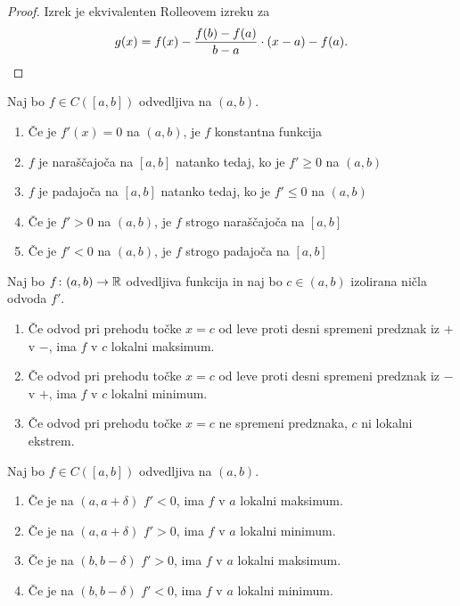 \documentclass[12pt, a4paper]{article}
\begin{document}
\begin{proof}
Izrek je ekvivalenten Rolleovem izreku za
\[
g(x)=f(x)-\frac{f(b)-f(a)}{b-a}\cdot (x-a)-f(a).\qedhere
\]
\end{proof}

\begin{posledica}\label{psl:lag}
Naj bo $f\in C\left([a,b]\right)$ odvedljiva na $(a,b)$.

\begin{enumerate}[label=\arabic*)]
\item Če je $f'(x)=0$ na $(a,b)$, je $f$ konstantna funkcija
\item $f$ je naraščajoča na $[a,b]$ natanko tedaj, ko je $f'\geq 0$ na $(a,b)$
\item $f$ je padajoča na $[a,b]$ natanko tedaj, ko je $f'\leq 0$ na $(a,b)$
\item Če je $f'>0$ na $(a,b)$, je $f$ strogo naraščajoča na $[a,b]$
\item Če je $f'<0$ na $(a,b)$, je $f$ strogo padajoča na $[a,b]$
\end{enumerate}
\end{posledica}

\begin{posledica}
Naj bo $f\colon(a,b)\to\mathbb{R}$ odvedljiva funkcija in naj bo $c\in(a,b)$ izolirana ničla odvoda $f'$.

\begin{enumerate}[label=\arabic*)]
\item Če odvod pri prehodu točke $x=c$ od leve proti desni spremeni predznak iz $+$ v $-$, ima $f$ v $c$ lokalni maksimum.
\item Če odvod pri prehodu točke $x=c$ od leve proti desni spremeni predznak iz $-$ v $+$, ima $f$ v $c$ lokalni minimum.
\item Če odvod pri prehodu točke $x=c$ ne spremeni predznaka, $c$ ni lokalni ekstrem.
\end{enumerate}
\end{posledica}

\begin{opomba}
Naj bo $f\in C\left([a,b]\right)$ odvedljiva na $(a,b)$.

\begin{enumerate}[label=\arabic*)]
\item Če je na $(a,a+\delta)$ $f'<0$, ima $f$ v $a$ lokalni maksimum.
\item Če je na $(a,a+\delta)$ $f'>0$, ima $f$ v $a$ lokalni minimum.
\item Če je na $(b,b-\delta)$ $f'>0$, ima $f$ v $a$ lokalni maksimum.
\item Če je na $(b,b-\delta)$ $f'<0$, ima $f$ v $a$ lokalni minimum.
\end{enumerate}
\end{opomba}
\end{document}
